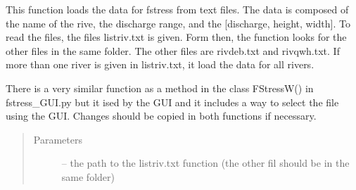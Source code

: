 \documentclass[letterpaper,10pt,english]{sphinxmanual}
\begin{document}
\begin{fulllineitems}
\label{\detokenize{index:src.func_for_cmd.load_fstress_text}}
This function loads the data for fstress from text files. The data is composed of the name of the rive, the
discharge range, and the {[}discharge, height, width{]}. To read the files, the files listriv.txt is given. Form then,
the function looks for the other files in the same folder. The other files are rivdeb.txt and rivqwh.txt. If more
than one river is given in listriv.txt, it load the data for all rivers.

There is a very similar function as a method in the class FStressW() in fstress\_GUI.py but it ised by the GUI
and it includes a way to select the file using the GUI. Changes should be copied in both functions if necessary.
\begin{quote}\begin{description}
\item[{Parameters}] \leavevmode
{} -- the path to the listriv.txt function (the other fil should be in the same folder)

\end{description}\end{quote}

\end{fulllineitems}

\end{document}
